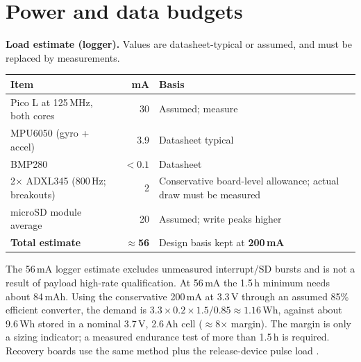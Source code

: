 \section{Power and data budgets}
\label{sec:power}
\textbf{Load estimate (logger).} Values are datasheet-typical or assumed, and must be replaced by measurements.

\small
\begingroup
{}
\begin{tabularx}{\linewidth}{@{}L{48mm}r Y@{}}
\toprule{}\textbf{Item}&\textbf{mA}&\textbf{Basis}\\\midrule
Pico L at 125\,MHz, both cores & 30 & Assumed; measure \cite{rp2040ds}\\
MPU6050 (gyro + accel) & 3.9 & Datasheet typical \cite{mpu6050ds}\\
BMP280 & $<0.1$ & Datasheet \cite{bmp280ds}\\
2$\times$ ADXL345 (800\,Hz; breakouts) & 2 & Conservative board-level allowance; actual draw must be measured \cite{adxl345ds}\\
microSD module average & 20 & Assumed; write peaks higher\\
\midrule
\textbf{Total estimate} & \textbf{$\approx$56} & Design basis kept at \textbf{200\,mA}\\
\bottomrule
\end{tabularx}
\endgroup %
\normalsize

The 56\,mA logger estimate excludes unmeasured interrupt/SD bursts and is not a result of payload high-rate qualification. At 56\,mA the 1.5\,h minimum \cite{rtc2027app03} needs about 84\,mAh. Using the conservative 200\,mA at 3.3\,V through an assumed 85\% efficient converter, the demand is $3.3\times0.2\times1.5/0.85\approx1.16$\,Wh, against about 9.6\,Wh stored in a nominal 3.7\,V, 2.6\,Ah cell ($\approx$8$\times$ margin). The margin is only a sizing indicator; a measured endurance test of more than 1.5\,h is required. Recovery boards use the same method plus the release-device pulse load .

